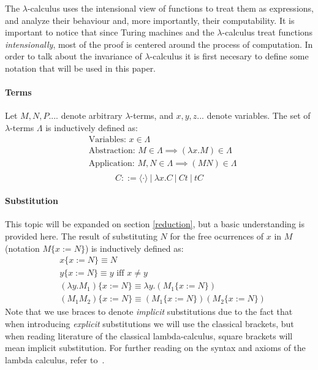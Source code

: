 \documentclass[12pt]{article}
\begin{document}
The $\lambda$-calculus uses the intensional view of functions to treat them as expressions, and analyze their behaviour and, more importantly, their computability. It is important to notice that since Turing machines and the $\lambda$-calculus treat functions \textit{intensionally}, most of the proof is centered around the process of computation.
In order to talk about the invariance of $\lambda$-calculus it is first necesary to define some notation that will be used in this paper.
\paragraph{Terms} Let $M, N, P....$ denote arbitrary $\lambda$-terms, and $x,y,z...$ denote variables. The set of $\lambda$-terms $\Lambda$ is inductively defined as:
\begin{equation}
  \begin{split}
  & \text{Variables: } x \in \Lambda \\
  & \text{Abstraction: } M \in \Lambda \implies ( \lambda x.M ) \in \Lambda \\
  & \text{Application: } M, N \in \Lambda \implies (M N) \in \Lambda \\
  \end{split}
\end{equation}
\begin{equation}
C ::= \langle \cdot \rangle \ | \ \lambda x.C \ | \ Ct \ | \ tC
\end{equation}
\paragraph{Substitution} This topic will be expanded on section \ref{reduction}, but a basic understanding is provided here.
The result of substituting $N$ for the free ocurrences of $x$ in $M$ (notation $M \{ x:= N \} $) is inductively defined as:
\begin{equation}
  \begin{split}
    & x\{ x := N \} \equiv N \\
    & y \{ x := N \} \equiv y \text{ iff } x \neq y \\
    & (\lambda y.M_{1}) \{ x:=N \} \equiv \lambda y. ( M_{1} \{ x:=N \} ) \\
    & (M_{1}M_{2}) \{ x:=N \} \equiv (M_{1}\{ x:=N \} )(M_{2} \{ x:=N \} )
  \end{split}
\end{equation}
Note that we use braces to denote \textit{implicit} substitutions due to the fact that when introducing \textit{explicit} substitutions we will use the classical brackets, but when reading literature of the classical lambda-calculus, square brackets will mean implicit substitution.
For further reading on the syntax and axioms of the lambda calculus, refer to~\cite{barendregt1984lambda}.
\end{document}
